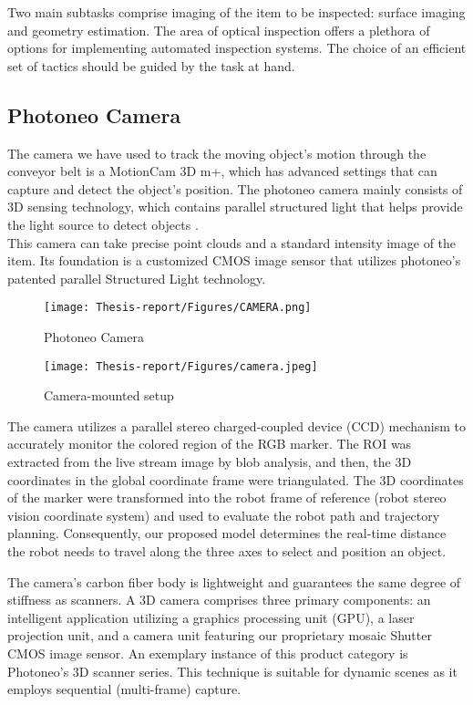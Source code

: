 \documentclass[12pt]{article}
\begin{document}
Two main subtasks comprise imaging of the item to be inspected: surface imaging and geometry estimation. The area of optical inspection offers a plethora of options for implementing automated inspection systems. The choice of an efficient set of tactics should be guided by the task at hand. 

\subsection{Photoneo Camera}


The camera we have used to track the moving object's motion through the conveyor belt is a 
MotionCam 3D m+, which has advanced settings that can capture and detect the object's position. The photoneo camera mainly consists of 3D sensing technology, which contains parallel structured light that helps provide the light source to detect objects \cite{ref2}.\\

This camera can take precise point clouds and a standard intensity image of the item.  Its foundation is a customized CMOS image sensor that utilizes photoneo's patented parallel Structured Light technology\cite{ref15}.

\begin{figure}[h]
    \centering
    \texttt{[image: Thesis-report/Figures/CAMERA.png]}
    \caption{Photoneo Camera \cite{ref2}} 
    \label{fig:Photoneo-camera}
\end{figure}

\begin{figure}[h]
    \centering
    \texttt{[image: Thesis-report/Figures/camera.jpeg]}
    \caption{Camera-mounted setup}
    \label{fig:camera-setup}
\end{figure}

The camera utilizes a parallel stereo charged-coupled device (CCD) mechanism to accurately monitor the colored region of the RGB marker.  The ROI was extracted from the live stream image by blob analysis, and then, the 3D coordinates in the global coordinate frame were triangulated. The 3D coordinates of the marker were transformed into the robot frame of reference (robot stereo vision coordinate system) and used to evaluate the robot path and trajectory planning.   Consequently, our proposed model determines the real-time distance the robot needs to travel along the three axes to select and position an object\cite{ref15}.

The camera's carbon fiber body is lightweight and guarantees the same degree of stiffness as scanners. A 3D camera comprises three primary components: an intelligent application utilizing a graphics processing unit (GPU), a laser projection unit, and a camera unit featuring our proprietary mosaic Shutter CMOS image sensor.    An exemplary instance of this product category is Photoneo's 3D scanner series.  This technique is suitable for dynamic scenes as it employs sequential (multi-frame) capture\cite{ref15}.
\end{document}
